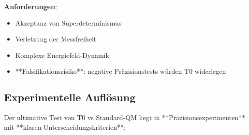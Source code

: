 \documentclass[12pt,a4paper]{article}
\begin{document}
	\textbf{Anforderungen}:
	\begin{itemize}
		\item Akzeptanz von Superdeterminismus
		\item Verletzung der Messfreiheit
		\item Komplexe Energiefeld-Dynamik
		\item **Falsifikationsrisiko**: negative Präzisionstests würden T0 widerlegen
	\end{itemize}
	
	\subsection{Experimentelle Auflösung}
	
	Der ultimative Test von T0 vs Standard-QM liegt in **Präzisionsexperimenten** mit **klaren Unterscheidungskriterien**:
	
\end{document}
